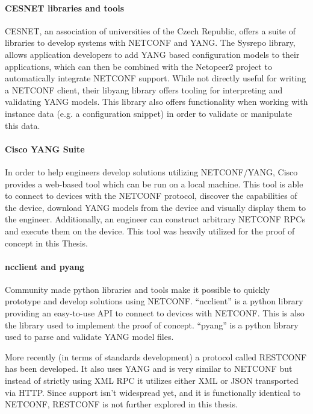 \paragraph{CESNET libraries and tools} CESNET, an association of universities of the Czech Republic,
offers a suite of libraries to develop systems with NETCONF and YANG.
The Sysrepo  library, allows application developers to add YANG based configuration models to their
applications, which can then be combined with the Netopeer2 project to automatically integrate NETCONF
support. While not directly useful for writing a NETCONF client, their libyang  library offers
tooling for interpreting and validating YANG models. This library also offers functionality when
working with instance data (e.g. a configuration snippet) in order to validate or manipulate this data.

\paragraph{Cisco YANG Suite} In order to help engineers develop solutions
utilizing NETCONF/YANG, Cisco provides a web-based tool which can be run
on a local machine. This tool is able to connect to devices with the
NETCONF protocol, discover the capabilities of the device, download YANG
models from the device and visually display them to the engineer.
Additionally, an engineer can construct arbitrary NETCONF RPCs and
execute them on the device. This tool was heavily utilized for the
proof of concept in this Thesis.

\paragraph{ncclient and pyang} Community made python libraries and tools
make it possible to quickly prototype and develop solutions using NETCONF.
``ncclient'' is a python library providing an easy-to-use API to connect
to devices with NETCONF. This is also the library used to implement the
proof of concept. ``pyang'' is a python library used to parse and
validate YANG model files.  

More recently (in terms of standards development) a protocol called RESTCONF
has been developed. It also uses YANG and is very similar to NETCONF but
instead of strictly using XML RPC it utilizes either XML or JSON transported
via HTTP. Since support isn't widespread yet, and it is functionally identical
to NETCONF, RESTCONF is not further explored in this thesis.

